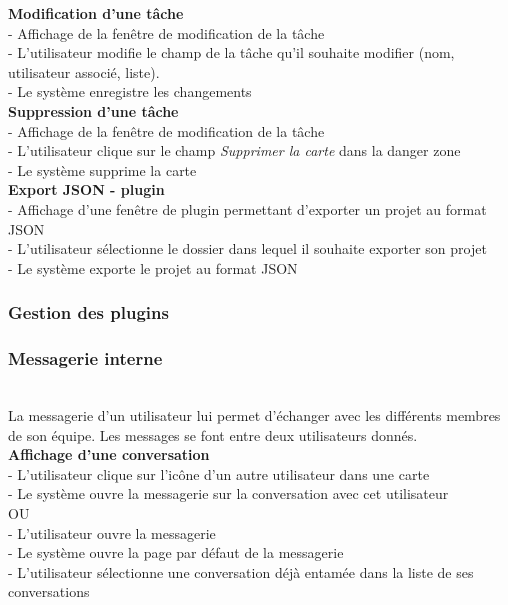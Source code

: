 \documentclass[conference]{IEEEtran}
\begin{document}
\textbf{Modification d'une tâche}\\
- Affichage de la fenêtre de modification de la tâche\\
- L'utilisateur modifie le champ de la tâche qu'il souhaite modifier (nom, utilisateur associé, liste).\\
- Le système enregistre les changements\\

\textbf{Suppression d'une tâche}\\
- Affichage de la fenêtre de modification de la tâche\\
- L'utilisateur clique sur le champ \textit{Supprimer la carte} dans la danger zone\\
- Le système supprime la carte\\

\textbf{Export JSON - plugin}\\
- Affichage d'une fenêtre de plugin permettant d'exporter un projet au format JSON\\
- L'utilisateur sélectionne le dossier dans lequel il souhaite exporter son projet\\
- Le système exporte le projet au format JSON\\

\subsubsection{Gestion des plugins}

\subsubsection{Messagerie interne}\hfill\\

La messagerie d'un utilisateur lui permet d'échanger avec les différents membres de son équipe. Les messages se font entre deux utilisateurs donnés.\\

\textbf{Affichage d'une conversation}\\
- L'utilisateur clique sur l'icône d'un autre utilisateur dans une carte\\
- Le système ouvre la messagerie sur la conversation avec cet utilisateur\\
OU\\
- L'utilisateur ouvre la messagerie\\
- Le système ouvre la page par défaut de la messagerie\\
- L'utilisateur sélectionne une conversation déjà entamée dans la liste de ses conversations\\
\end{document}
